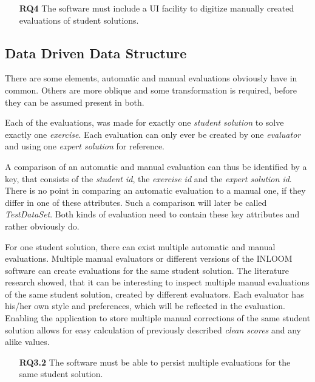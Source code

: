 \begin{itemize}
    \item[\textbf{RQ4}] The software must include a UI facility to digitize manually created 
    evaluations of student solutions. 
\end{itemize}



\subsection{Data Driven Data Structure}

There are some elements, automatic and manual evaluations obviously have in common. Others are
more oblique and some transformation is required, before they can be assumed present in both. 

Each of the evaluations, was made for exactly one \textit{student solution} to solve exactly one 
\textit{exercise}. Each evaluation can only ever be created by one \textit{evaluator} and 
using one \textit{expert solution} for reference. 

A comparison of an automatic and manual evaluation can thus be identified by a key, that consists
of the \textit{student id}, the \textit{exercise id} and the \textit{expert solution id}. There 
is no point in comparing an automatic evaluation to a manual one, if they differ in one of these
attributes. Such a comparison will later be called \textit{TestDataSet}. Both kinds of evaluation
need to contain these key attributes and rather obviously do.

For one student solution, there can exist multiple automatic and manual evaluations. Multiple
manual evaluators or different versions of the INLOOM software can create evaluations for 
the same student solution. The literature research showed, that it can be interesting to inspect
multiple manual evaluations of the same student solution, created by different evaluators. Each
evaluator has his/her own style and preferences, which will be reflected in the evaluation. 
Enabling the application to store multiple manual corrections of the same student solution 
allows for easy calculation of previously described \textit{clean scores} and any alike values. 

\begin{itemize}
    \item[\textbf{RQ3.2}] The software must be able to persist multiple evaluations for the 
    same student solution. 
\end{itemize}

